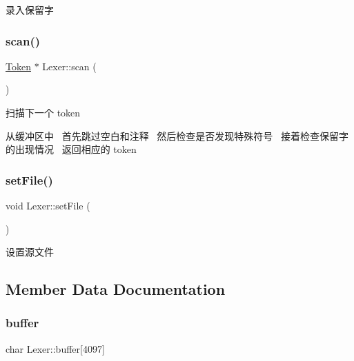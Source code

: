 录入保留字 

\mbox{\label{class_lexer_a2085b8262f6237de60583375ee2731f4}} 
\subsubsection{\texorpdfstring{scan()}{scan()}}
{\footnotesize\ttfamily \hyperlink{class_token}{Token} $\ast$ Lexer\+::scan (\begin{DoxyParamCaption}{ }\end{DoxyParamCaption})}



扫描下一个 token 

从缓冲区中~\newline
首先跳过空白和注释~\newline
然后检查是否发现特殊符号~\newline
接着检查保留字的出现情况~\newline
返回相应的 token~\newline
\mbox{\label{class_lexer_a9d7cdd99b7b18e3450cc365971bf76d2}} 
\subsubsection{\texorpdfstring{set\+File()}{setFile()}}
{\footnotesize\ttfamily void Lexer\+::set\+File (\begin{DoxyParamCaption}{ }\end{DoxyParamCaption})}



设置源文件 



\subsection{Member Data Documentation}
\mbox{\label{class_lexer_a372c56c466c70d808bdcdb11e94bd914}} 
\subsubsection{\texorpdfstring{buffer}{buffer}}
{\footnotesize\ttfamily char Lexer\+::buffer\mbox{[}4097\mbox{]}\hspace{0.3cm}{\ttfamily [private]}}




